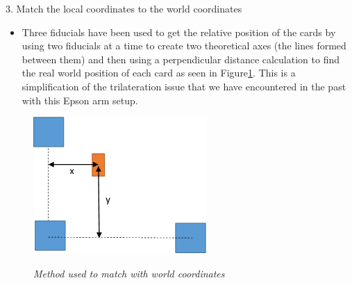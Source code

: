 3.	Match the local coordinates to the world coordinates
\begin{itemize}
	\item Three fiducials have been used to get the relative position of the cards by using two fiducials at a time to create two theoretical axes (the lines formed between them) and then using a perpendicular distance calculation to find the real world position of each card as seen in Figure\ref{trilatAlternate}. This is a simplification of the trilateration issue that we have encountered in the past with this Epson arm setup.
	
\end{itemize}
\begin{figure}[position = here]
	\begin{centering}
		\includegraphics[scale=0.8]{./sachiths_images/image4.png}\\
		\caption[]{\textit{Method used to match with world coordinates\label{trilatAlternate}}}
	\end{centering}
\end{figure}

